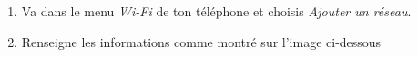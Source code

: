 \documentclass{../templates/enpc-ki/ki020}
\begin{document}
    {\begin{enumerate}

      \item Va dans le menu \emph{Wi-Fi} de ton téléphone et choisis \emph{Ajouter un réseau}.
      \item Renseigne les informations comme montré sur l'image ci-dessous
      \begin{figure}[h!]
        \centering
        \qquad
      \end{figure}
    \end{enumerate}}



  \vspace{2cm}
\end{document}
